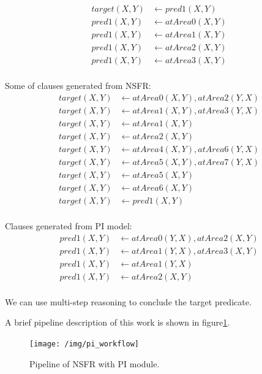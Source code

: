 \begin{align*}
    target(X,Y) &\leftarrow pred1(X,Y) \\
    pred1(X,Y) &\leftarrow atArea0(X,Y) \\
    pred1(X,Y) &\leftarrow atArea1(X,Y) \\
    pred1(X,Y) &\leftarrow atArea2(X,Y) \\
    pred1(X,Y) &\leftarrow atArea3(X,Y) \\
\end{align*}

Some of clauses generated from NSFR:
\begin{align*}
    target(X,Y) &\leftarrow atArea0(X,Y), atArea2(Y,X)  \\
    target(X,Y) &\leftarrow atArea1(X,Y),atArea3(Y,X) \\
    target(X,Y) &\leftarrow atArea1(X,Y) \\
    target(X,Y) &\leftarrow atArea2(X,Y) \\
    target(X,Y) &\leftarrow atArea4(X,Y),atArea6(Y,X) \\
    target(X,Y) &\leftarrow atArea5(X,Y),atArea7(Y,X) \\
    target(X,Y) &\leftarrow atArea5(X,Y) \\
    target(X,Y) &\leftarrow atArea6(X,Y) \\
    target(X,Y) &\leftarrow pred1(X,Y) \\
\end{align*}

Clauses generated from PI model:
\begin{align*}
    pred1(X,Y) &\leftarrow atArea0(Y,X), atArea2(X,Y) \\
    pred1(X,Y) &\leftarrow atArea1(Y,X),  atArea3(X,Y) \\
    pred1(X,Y) &\leftarrow atArea1(Y,X) \\
    pred1(X,Y) &\leftarrow atArea2(X,Y) \\
\end{align*}

We can use multi-step reasoning to conclude the target predicate.

A brief pipeline description of this work is shown in figure\ref{fig:pi_workflow}.
\begin{figure}[ht]
    \centering
    \texttt{[image: /img/pi\_workflow]}
    \caption{Pipeline of NSFR with PI module.}
    \label{fig:pi_workflow}
\end{figure}



